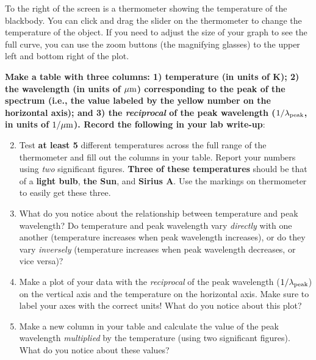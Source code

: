 \documentclass[11pt]{article}
\begin{document}
To the right of the screen is a thermometer showing the temperature of the blackbody. You can click and drag the slider on the thermometer to change the temperature of the object. If you need to adjust the size of your graph to see the full curve, you can use the zoom buttons (the magnifying glasses) to the upper left and bottom right of the plot.

\bigskip
\textbf{Make a table with three columns: 1) temperature (in units of K); 2) the wavelength (in units of $\rm \mu m$) corresponding to the peak of the spectrum (i.e., the value labeled by the yellow number on the horizontal axis); and 3) the \emph{reciprocal} of the peak wavelength ($1/\lambda_{\rm peak}$, in units of $\rm 1/\mu m$). Record the following in your lab write-up}: 
\begin{enumerate}
    \setcounter{enumi}{1}
    
    \item Test \textbf{at least 5} different temperatures across the full range of the thermometer and fill out the columns in your table. Report your numbers using \emph{two} significant figures. \textbf{Three of these temperatures} should be that of a \textbf{light bulb}, \textbf{the Sun}, and \textbf{Sirius A}. Use the markings on thermometer to easily get these three.
    \item What do you notice about the relationship between temperature and peak wavelength? Do temperature and peak wavelength vary \emph{directly} with one another (temperature increases when peak wavelength increases), or do they vary \emph{inversely} (temperature increases when peak wavelength decreases, or vice versa)?
    \item Make a plot of your data with the \emph{reciprocal} of the peak wavelength ($1/\lambda_{\rm peak}$) on the vertical axis and the temperature on the horizontal axis. Make sure to label your axes with the correct units! What do you notice about this plot? 
    \item Make a new column in your table and calculate the value of the peak wavelength \emph{multiplied} by the temperature (using two significant figures). What do you notice about these values? 
\end{enumerate}
\end{document}
